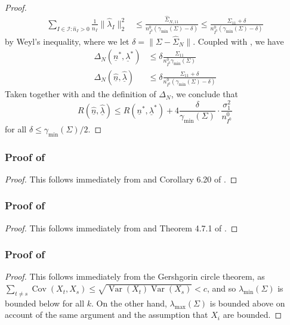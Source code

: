 \documentclass{article} %
\DeclareMathOperator{\Var}{Var}
\DeclareMathOperator{\Cov}{Cov}
\newcommand{\wh}[1]{\widehat{#1}}
\newcommand{\ul}[1]{\underline{#1}}
\begin{document}
\begin{proof}
\begin{align*}
    \sum_{I\in\mathcal{I}:\wh{n}_I>0} \frac{1}{\wh{n}_I} \|\wh{\lambda}_I\|_2^2 &\leq \frac{\wh{\Sigma}_{N,11}}{n^0_{I^0}(\gamma_{\min}(\Sigma)-\delta)} \leq \frac{{\Sigma}_{11}+\delta}{n^0_{I^0}(\gamma_{\min}(\Sigma)-\delta)}
\end{align*}
by Weyl's inequality, where we let $\delta=\|\Sigma-\wh{\Sigma}_N\|$. Coupled with , we have
\begin{align*}
\Delta_N(\ul{n}^*,\ul{\lambda}^*) &\leq \delta \frac{\Sigma_{11}}{n^0_{I^0}\gamma_{\min}(\Sigma)} \\
\Delta_N(\wh{\ul{n}},\wh{\ul{\lambda}}) &\leq \delta \frac{{\Sigma}_{11}+\delta}{n^0_{I^0}(\gamma_{\min}(\Sigma)-\delta)}
\end{align*}
Taken together with  and the definition of $\Delta_N$, we conclude that
\[
R(\wh{\ul{n}},\wh{\ul{\lambda}}) \leq R({\ul{n}}^*,{\ul{\lambda}}^*) + 4\frac{\delta}{\gamma_{\min}(\Sigma)}\cdot \frac{\sigma^2_1}{n^0_{I^0}}
\]
for all $\delta \leq \gamma_{\min}(\Sigma)/2$.
\end{proof}

\subsubsection{Proof of }
\begin{proof}
    This follows immediately from  and Corollary 6.20 of \citet{wainwright2019high}.
\end{proof}

\subsubsection{Proof of }
\begin{proof}
    This follows immediately from  and Theorem 4.7.1 of \citet{vershynin2018high}.
\end{proof}

\subsubsection{Proof of }
\begin{proof}
    This follows immediately from the Gershgorin circle theorem, as $\sum_{t\neq s} \Cov(X_t,X_s) \leq \sqrt{\Var(X_t)\Var(X_s)}<c$, and so $\lambda_{\min}(\Sigma)$ is bounded below for all $k$. On the other hand, $\lambda_{\max}(\Sigma)$ is bounded above on account of the same argument and the assumption that $X_i$ are bounded.
\end{proof}
\end{document}
